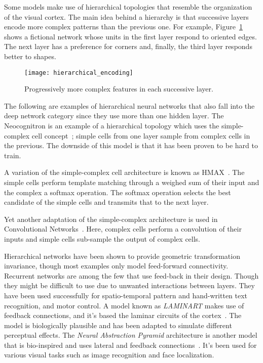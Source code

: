 Some models make use of hierarchical topologies that resemble the organization of the visual cortex. The main idea behind a hierarchy is that successive layers encode more complex patterns than the previous one. For example, Figure~\ref{fig:vision:hierarchical_encoding} shows a fictional network whose units in the first layer respond to oriented edges. The next layer has a preference for corners and, finally, the third layer responds better to shapes.

\begin{figure}[h]
  \begin{center}
    \texttt{[image: hierarchical\_encoding]}
    \caption{Progressively more complex features in each successive layer.}
    \label{fig:vision:hierarchical_encoding}
  \end{center}
\end{figure}

The following are examples of hierarchical neural networks that also fall into the deep network category since they use more than one hidden layer.
The Neocognitron is an example of a hierarchical topology which uses the simple-complex cell concept~\cite{fukushima1988neocognitron}; simple cells from one layer sample from complex cells in the previous. The downside of this model is that it has been proven to be hard to train.

A variation of the simple-complex cell architecture is known as HMAX~\cite{riesenhuber1999hierarchical}. The simple cells perform template matching through a weighed sum of their input and the complex a softmax operation. The softmax operation selects the best candidate of the simple cells and transmits that to the next layer.

Yet another adaptation of the simple-complex architecture is used in Convolutional Networks~\cite{lecun-1990handwritten}. Here, complex cells perform a convolution of their inputs and simple cells sub-sample the output of complex cells.

Hierarchical networks have been shown to provide geometric transformation invariance, though most examples only model feed-forward connectivity. Recurrent networks are among the few that use feed-back in their design. Though they might be difficult to use due to unwanted interactions between layers. They have been used successfully for spatio-temporal pattern and hand-written text recognition, and motor control. A model known as \emph{LAMINART} makes use of feedback connections, and it's based the laminar circuits of the cortex~\cite{raizada2003laminart}. The model is biologically plausible and has been adapted to simulate different perceptual effects. The \emph{Neural Abstraction Pyramid} architecture is another model that is bio-inspired and uses lateral and feedback connections~\cite{behnke2003hierarchical}. It's been used for various visual tasks such as image recognition and face localization.

